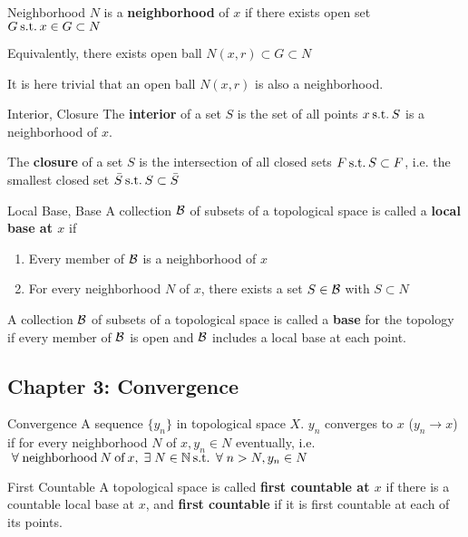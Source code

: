 \documentclass[a4paper, 10pt]{article}
\begin{document}
\begin{definition} {Neighborhood}
    $N$ is a \textbf{neighborhood} of $x$ if there exists open set $G \hspace*{2pt}\text{s.t.}\hspace*{2pt} x \in G \subset N$

    Equivalently, there exists open ball $N(x, r) \subset G \subset N$

    It is here trivial that an open ball $N(x, r)$ is also a neighborhood.
\end{definition}

\begin{definition} {Interior, Closure}
    The \textbf{interior} of a set $S$ is the set of all points $x \hspace*{2pt}\text{s.t.}\hspace*{2pt} S$ is a neighborhood of $x$.

    The \textbf{closure} of a set $S$ is the intersection of all closed sets $F \hspace*{2pt}\text{s.t.}\hspace*{2pt} S \subset F$, i.e. the smallest closed set $\bar{S} \hspace*{2pt}\text{s.t.}\hspace*{2pt} S \subset \bar{S}$
\end{definition}

\begin{definition} {Local Base, Base}
    A collection $\mathcal{B}$ of subsets of a topological space is called a \textbf{local base at $x$} if
    \begin{enumerate}
        \item Every member of $\mathcal{B}$ is a neighborhood of $x$
        \item For every neighborhood $N$ of $x$, there exists a set $S \in \mathcal{B}$ with $S \subset N$
    \end{enumerate}

    A collection $\mathcal{B}$ of subsets of a topological space is called a \textbf{base} for the topology if every member of $\mathcal{B}$ is open and $\mathcal{B}$ includes a local base at each point.
\end{definition}

\subsection{Chapter 3: Convergence}
\begin{definition} {Convergence}
    A sequence $\{y_n\}$ in topological space $X$. $y_n$ converges to $x$ ($y_n \to x$) if for every neighborhood $N$ of $x, y_n \in N$ eventually, i.e. $\forall \text{neighborhood}\: N \:\text{of}\: x, \exists N \in \bbn \st \forall n > N, y_n \in N$
\end{definition}

\begin{definition} {First Countable}
    A topological space is called \textbf{first countable at $x$} if there is a countable local base at $x$, and \textbf{first countable} if it is first countable at each of its points.
\end{definition}
\end{document}
